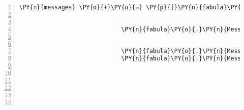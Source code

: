 \begin{Verbatim}[commandchars=\\\{\},numbers=left,firstnumber=1,stepnumber=1]
                \PY{n}{messages} \PY{o}{+}\PY{o}{=} \PY{p}{[}\PY{n}{fabula}\PY{o}{.}\PY{n}{Message}\PY{p}{(}\PY{p}{[}\PY{n}{fabula}\PY{o}{.}\PY{n}{DropsEvent}\PY{p}{(}\PY{n}{ID\PYZus{}KUNI}\PY{p}{,}
                                                               \PY{n+nb+bp}{self}\PY{o}{.}\PY{n}{host}\PY{o}{.}\PY{n}{rack}\PY{o}{.}\PY{n}{entity\PYZus{}dict}\PY{p}{[}\PY{l+s}{\PYZsq{}}\PY{l+s}{string\PYZus{}harp}\PY{l+s}{\PYZsq{}}\PY{p}{]}\PY{p}{,}
                                                               \PY{n}{room}\PY{o}{.}\PY{n}{entity\PYZus{}locations}\PY{p}{[}\PY{n}{ID\PYZus{}CASSANDRA}\PY{p}{]}\PY{p}{)}\PY{p}{]}\PY{p}{)}\PY{p}{,}
                             \PY{n}{fabula}\PY{o}{.}\PY{n}{Message}\PY{p}{(}\PY{p}{[}\PY{n}{fabula}\PY{o}{.}\PY{n}{DropsEvent}\PY{p}{(}\PY{n}{ID\PYZus{}CASSANDRA}\PY{p}{,}
                                                               \PY{n+nb+bp}{self}\PY{o}{.}\PY{n}{host}\PY{o}{.}\PY{n}{rack}\PY{o}{.}\PY{n}{entity\PYZus{}dict}\PY{p}{[}\PY{l+s}{\PYZsq{}}\PY{l+s}{lute\PYZus{}broken}\PY{l+s}{\PYZsq{}}\PY{p}{]}\PY{p}{,}
                                                               \PY{n}{room}\PY{o}{.}\PY{n}{entity\PYZus{}locations}\PY{p}{[}\PY{n}{ID\PYZus{}CASSANDRA}\PY{p}{]}\PY{p}{)}\PY{p}{]}\PY{p}{)}\PY{p}{,}
                             \PY{n}{fabula}\PY{o}{.}\PY{n}{Message}\PY{p}{(}\PY{p}{[}\PY{n}{fabula}\PY{o}{.}\PY{n}{DeleteEvent}\PY{p}{(}\PY{n}{identifier}\PY{o}{=}\PY{l+s}{\PYZsq{}}\PY{l+s}{string\PYZus{}harp}\PY{l+s}{\PYZsq{}}\PY{p}{)}\PY{p}{]}\PY{p}{)}\PY{p}{,}
                             \PY{n}{fabula}\PY{o}{.}\PY{n}{Message}\PY{p}{(}\PY{p}{[}\PY{n}{fabula}\PY{o}{.}\PY{n}{SpawnEvent}\PY{p}{(}\PY{n}{fabula}\PY{o}{.}\PY{n}{Entity}\PY{p}{(}\PY{l+s}{\PYZsq{}}\PY{l+s}{lute}\PY{l+s}{\PYZsq{}}\PY{p}{,}
                                                                             \PY{n}{fabula}\PY{o}{.}\PY{n}{ITEM}\PY{p}{,}
                                                                             \PY{n+nb+bp}{True}\PY{p}{,}
                                                                             \PY{n+nb+bp}{True}\PY{p}{,}
                                                                             \PY{p}{\PYZob{}}\PY{l+s}{\PYZsq{}}\PY{l+s}{image/png}\PY{l+s}{\PYZsq{}}\PY{p}{:} \PY{n}{fabula}\PY{o}{.}\PY{n}{Asset}\PY{p}{(}\PY{n}{uri}\PY{o}{=}\PY{l+s}{\PYZsq{}}\PY{l+s}{lute.png}\PY{l+s}{\PYZsq{}}\PY{p}{,}
                                                                                                        \PY{n}{data}\PY{o}{=}\PY{n+nb+bp}{None}\PY{p}{)}\PY{p}{,}
                                                                              \PY{l+s}{\PYZsq{}}\PY{l+s}{audio/ogg}\PY{l+s}{\PYZsq{}}\PY{p}{:} \PY{n}{fabula}\PY{o}{.}\PY{n}{Asset}\PY{p}{(}\PY{n}{uri}\PY{o}{=}\PY{l+s}{\PYZsq{}}\PY{l+s}{lute.ogg}\PY{l+s}{\PYZsq{}}\PY{p}{,}

\end{Verbatim}
